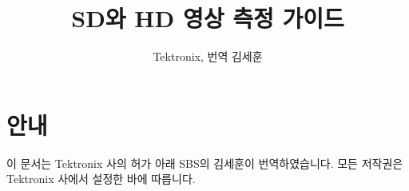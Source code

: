 \documentclass[10pt,twocolumn]{book}
\title{SD와 HD 영상 측정 가이드}
\author{Tektronix, 번역 김세훈}
\begin{document}
\maketitle
\tableofcontents

\onecolumn
\section{안내}
이 문서는 Tektronix 사의 허가 아래 SBS의 김세훈이 번역하였습니다. 모든 저작권은 Tektronix 사에서 설정한 바에 따릅니다.

\twocolumn





















\printindex
\end{document}
